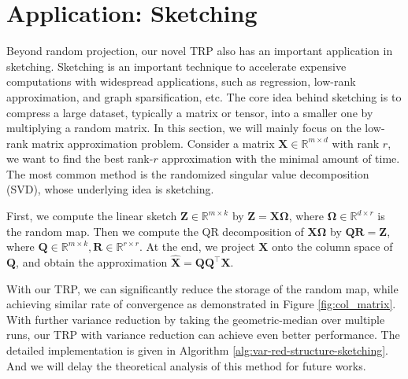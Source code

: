 \section{Application: Sketching}
\label{appendix:sketching}
Beyond random projection, our novel TRP also has an important application in sketching. Sketching is an important technique to accelerate expensive computations with widespread applications, such as regression, low-rank approximation, and graph sparsification, etc. \cite{halko2011finding,woodruff2014sketching} 
The core idea behind sketching is to compress a large dataset, typically a matrix or tensor, into a smaller one by multiplying a random matrix. 
In this section, we will mainly focus on the low-rank matrix approximation problem. Consider a matrix $\mathbf{X} \in \mathbb{R}^{m \times d}$ with rank $r$, 
we want to find the best rank-$r$ approximation with the minimal amount of time. The most common method is the randomized singular value decomposition (SVD), whose underlying idea is sketching. 


First, we compute the linear sketch $\mathbf{Z} \in \mathbb{R}^{m \times k}$ by $\mathbf{Z} =\mathbf{X}\mathbf{\Omega}$, where $\mathbf{\Omega} \in \mathbb{R}^{d \times r}$ is the random map. Then we compute the QR decomposition of $\mathbf{X}\mathbf{\Omega}$ by $\mathbf{Q}\mathbf{R} = \mathbf{Z}$, where $\mathbf{Q} \in \mathbb{R}^{m \times k}, \mathbf{R} \in \mathbb{R}^{r \times r}$. At the end, we project $\mathbf{X}$ onto the column space of $\mathbf{Q}$, and obtain the approximation $\hat{\mathbf{X}} = \mathbf{Q} \mathbf{Q}^\top \mathbf{X}$.  

With our TRP, we can significantly reduce the storage of the random map, while achieving similar rate of convergence as demonstrated in Figure \ref{fig:col_matrix}. 
With further variance reduction by taking the geometric-median over multiple runs, our TRP with variance reduction can achieve even better performance. The detailed implementation is given in Algorithm \ref{alg:var-red-structure-sketching}. And we will delay the theoretical analysis of this method for future works. 


